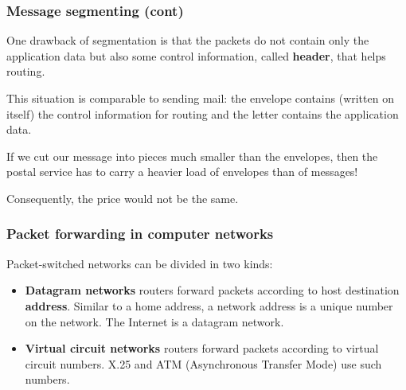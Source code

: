 %
\begin{frame}
\frametitle{Message segmenting (cont)}

One drawback of segmentation is that the packets do not contain only
the application data but also some control information, called
\textbf{header}, that helps routing.

\bigskip

This situation is comparable to sending mail: the envelope contains
(written on itself) the control information for routing and the letter
contains the application data.

\bigskip

If we cut our message into pieces much smaller than the envelopes,
then the postal service has to carry a heavier load of envelopes than
of messages!

\bigskip

Consequently, the price would not be the same.

\end{frame}

%
\begin{frame}
\frametitle{Packet forwarding in computer networks}

Packet-switched networks can be divided in two kinds:
\begin{itemize}

  \item \textbf{Datagram networks} routers forward packets according
  to host destination \textbf{address}. Similar to a home address, a
  network address is a unique number on the network. The Internet is a
  datagram network.

  \item \textbf{Virtual circuit networks} routers forward packets
  according to virtual circuit numbers. X.25 and ATM (Asynchronous
  Transfer Mode) use such numbers.

\end{itemize}

\end{frame}

